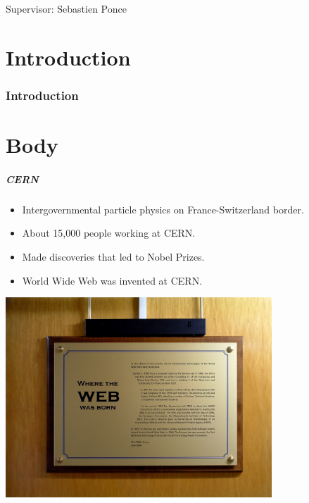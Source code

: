 \documentclass{beamer}
\begin{document}
\begin{frame}
    \maketitle

    Supervisor: Sebastien Ponce
\end{frame}

\part{Introduction}
\section*{Introduction}
\part{Body}

    \begin{frame}
        \frametitle{CERN}
        \begin{itemize}
            \item Intergovernmental particle physics on France-Switzerland border.
            \item About  15,000 people working at CERN.
            \item Made discoveries that led to Nobel Prizes.
            \item World Wide Web was invented at CERN.
        \end{itemize}
    \end{frame}

    \begin{frame}
        \includegraphics[width=0.75\textwidth]{WEB.jpg}
    \end{frame}
\end{document}
